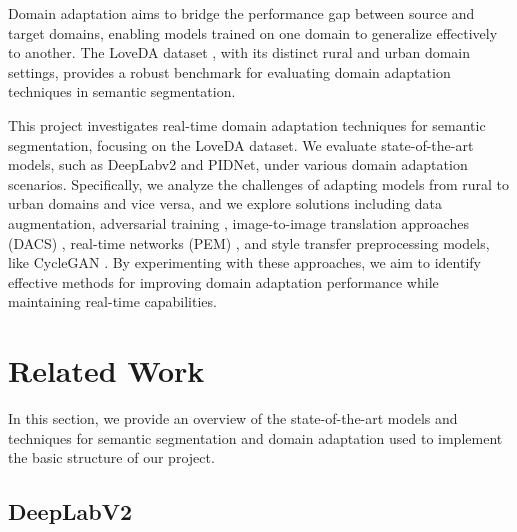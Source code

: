 \documentclass[10pt,twocolumn,letterpaper]{article}
\begin{document}
Domain adaptation aims to bridge the performance gap between source and target domains, enabling models trained on one domain to generalize effectively to another. The LoveDA dataset \cite{wang2021loveda}, with its distinct rural and urban domain settings, provides a robust benchmark for evaluating domain adaptation techniques in semantic segmentation. 

This project investigates real-time domain adaptation techniques for semantic segmentation, focusing on the LoveDA dataset. We evaluate state-of-the-art models, such as DeepLabv2 and PIDNet, under various domain adaptation scenarios. Specifically, we analyze the challenges of adapting models from rural to urban domains and vice versa, and we explore solutions including data augmentation, adversarial training \cite{tsai2018advlearning}, image-to-image translation approaches (DACS) \cite{tranheden2021dacs}, real-time networks (PEM) \cite{cavagnero2024pem}, and style transfer preprocessing models, like CycleGAN \cite{zhu2020cyclegan}. By experimenting with these approaches, we aim to identify effective methods for improving domain adaptation performance while maintaining real-time capabilities.

\section{Related Work}
\label{sec:related}

In this section, we provide an overview of the state-of-the-art models and techniques for semantic segmentation and domain adaptation used to implement the basic structure of our project.

\subsection{DeepLabV2}
\end{document}
